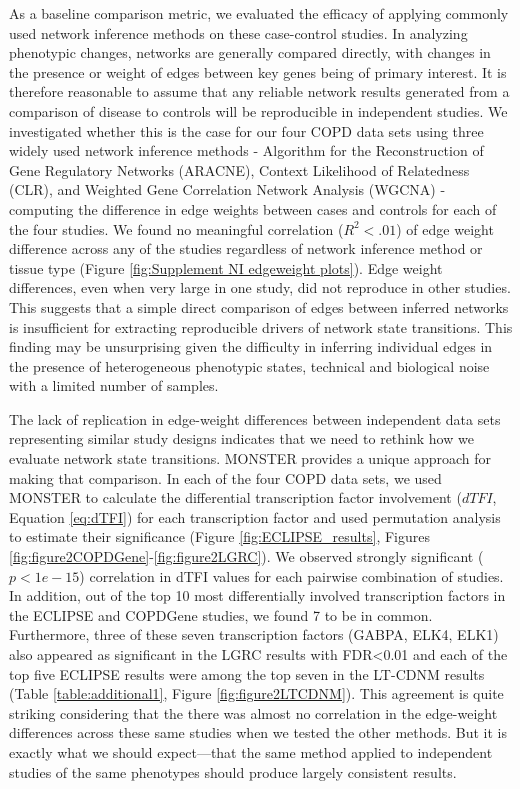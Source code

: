 As a baseline comparison metric, we evaluated the efficacy of applying commonly used network inference methods on these case-control studies. In analyzing phenotypic changes, networks are generally compared directly, with changes in the presence or weight of edges between key genes being of primary interest. It is therefore reasonable to assume that any reliable network results generated from a comparison of disease to controls will be reproducible in independent studies. We investigated whether this is the case for our four COPD data sets using three widely used network inference methods - Algorithm for the Reconstruction of Gene Regulatory Networks (ARACNE)\cite{margolin2006aracne}, Context Likelihood of Relatedness (CLR)\cite{faith2007large}, and Weighted Gene Correlation Network Analysis (WGCNA) \cite{zhang2005general} - computing the difference in edge weights between cases and controls for each of the four studies. We found no meaningful correlation ($R^{2}<.01$) of edge weight difference across any of the studies regardless of network inference method or tissue type (Figure \ref{fig:Supplement NI edgeweight plots}). Edge weight differences, even when very large in one study, did not reproduce in other studies. This suggests that a simple direct comparison of edges between inferred networks is insufficient for extracting reproducible drivers of network state transitions. This finding may be unsurprising given the difficulty in inferring individual edges in the presence of heterogeneous phenotypic states, technical and biological noise with a limited number of samples. 

The lack of replication in edge-weight differences between independent data sets representing similar study designs indicates that we need to rethink how we evaluate network state transitions. MONSTER provides a unique approach for making that comparison. In each of the four COPD data sets, we used MONSTER to calculate the differential transcription factor involvement ($dTFI$, Equation \ref{eq:dTFI}) for each transcription factor and used permutation analysis to estimate their significance (Figure \ref{fig:ECLIPSE_results}, Figures \ref{fig:figure2COPDGene}-\ref{fig:figure2LGRC}). We observed strongly significant ($p<1e-15$) correlation in dTFI values for each pairwise combination of studies. In addition, out of the top 10 most differentially involved transcription factors in the ECLIPSE and COPDGene studies, we found 7 to be in common. Furthermore, three of these seven transcription factors (GABPA, ELK4, ELK1) also appeared as significant in the LGRC results with FDR<0.01 and each of the top five ECLIPSE results were among the top seven in the LT-CDNM results (Table \ref{table:additional1}, Figure \ref{fig:figure2LTCDNM}). This agreement is quite striking considering that the there was almost no correlation in the edge-weight differences across these same studies when we tested the other methods. But it is exactly what we should expect---that the same method applied to independent studies of the same phenotypes should produce largely consistent results.


